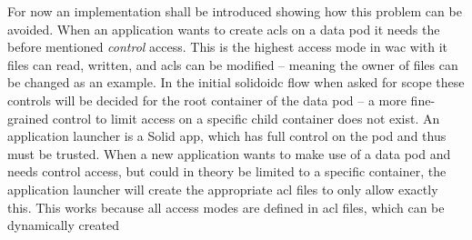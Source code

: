 For now an implementation shall be introduced showing how this problem can be avoided. When an application wants to create \glspl{acl} on a data pod it needs the before mentioned \textit{control} access. This is the highest access mode in \gls{wac} with it files can read, written, and \glspl{acl} can be modified -- meaning the owner of files can be changed as an example.
In the initial \gls{solidoidc} flow when asked for scope these controls will be decided for the root container of the data pod -- a more fine-grained control to limit access on a specific child container does not exist. An application launcher is a Solid app, which has full control on the pod and thus must be trusted. When a new application wants to make use of a data pod and needs control access, but could in theory be limited to a specific container, the application launcher will create the appropriate \gls{acl} files to only allow exactly this.
This works because all access modes are defined in \gls{acl} files, which can be dynamically created